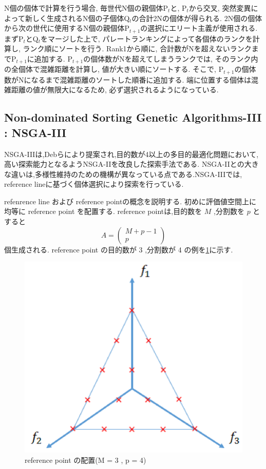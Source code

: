 \documentclass[11pt,a4j,notitlepage]{jreport}
\begin{document}
N個の個体で計算を行う場合, 毎世代N個の親個体P$_t$と, P$_t$から交叉, 突然変異によって新しく生成されるN個の子個体Q$_t$の合計2Nの個体が得られる.
2N個の個体から次の世代に使用するN個の親個体P$_{t+1}$の選択にエリート主義が使用される.
まずP$_t$とQ$_t$をマージした上で, パレートランキングによって各個体のランクを計算し, ランク順にソートを行う.
Rank1から順に, 合計数がNを超えないランクまでP$_{t+1}$に追加する.
P$_{t+1}$の個体数がNを超えてしまうランクでは, そのランク内の全個体で混雑距離を計算し, 値が大きい順にソートする.
そこで, P$_{t+1}$の個体数がNになるまで混雑距離のソートした順番に追加する.
端に位置する個体は混雑距離の値が無限大になるため, 必ず選択されるようになっている.

\subsection{Non-dominated Sorting Genetic Algorithms-III : NSGA-III}

NSGA-III\cite{Jain}は,Debらにより提案され,目的数が4以上の多目的最適化問題において,高い探索能力となるようNSGA-IIを改良した探索手法である.
NSGA-IIとの大きな違いは,多様性維持のための機構が異なっている点である.NSGA-IIIでは, reference lineに基づく個体選択により探索を行っている.

refenrence line および reference pointの概念を説明する.
初めに評価値空間上に均等に reference point を配置する. reference pointは,目的数を $M$ ,分割数を $p$ とすると
\[
  A = \left(
    \begin{array}{cc}
      M + p - 1 \\
            p
    \end{array}
  \right)
\]
個生成される. reference point の目的数が 3 ,分割数が 4 の例を\ref{fig:nsgaiii}に示す.
\begin{figure}[htbp]
\begin{center}
  \includegraphics[width=0.7\linewidth]{img/NSGAIII.png}
                \setlength{\abovecaptionskip}{0mm}
  \setlength{\belowcaptionskip}{0mm}
    \caption{reference point の配置(M = 3 , p = 4)}
\label{fig:nsgaiii}
\end{center}
\end{figure}
\end{document}
